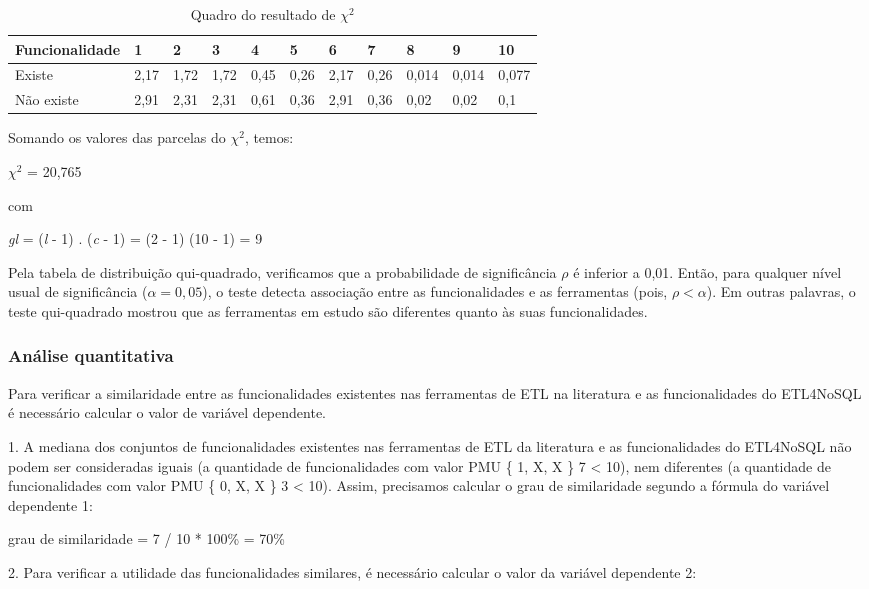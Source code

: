\begin{table}
	\centering
	\caption{Quadro do resultado de $ \chi^2 $}
	\label{chiquadrado}
	\begin{tabular}{|l|l|l|l|l|l|l|l|l|l|l|}
		\hline
		Funcionalidade & 1 & 2 & 3 & 4 & 5 & 6 & 7 & 8 & 9 & 10 \\ \hline
		Existe & 2,17 & 1,72 & 1,72 & 0,45 & 0,26 & 2,17 & 0,26 & 0,014 & 0,014 & 0,077  \\ \hline
		Não existe & 2,91 & 2,31 & 2,31 & 0,61 & 0,36 & 2,91 & 0,36 & 0,02 & 0,02 & 0,1 \\ \hline
	\end{tabular}
\end{table}

Somando os valores das parcelas do  $ \chi^2 $, temos: 

$ \chi^2 $ = 20,765

com

\textit{gl} = (\textit{l} - 1) . (\textit{c} - 1) = (2 - 1) (10 - 1) = 9

Pela tabela de distribuição qui-quadrado, verificamos que a probabilidade de significância $\rho$ é inferior a 0,01. Então, para qualquer nível usual de significância ($\alpha = 0,05$), o teste detecta associação entre as funcionalidades e as ferramentas (pois, $\rho < \alpha $). Em outras palavras, o teste qui-quadrado mostrou que as ferramentas em estudo são diferentes quanto às suas funcionalidades.

\subsubsection{Análise quantitativa}

Para verificar a similaridade entre as funcionalidades existentes nas ferramentas de ETL na literatura e as funcionalidades do ETL4NoSQL é necessário calcular o valor de variável dependente.

1. A mediana dos conjuntos de funcionalidades existentes nas ferramentas de ETL da literatura e as funcionalidades do ETL4NoSQL não podem ser consideradas iguais (a quantidade de funcionalidades com valor PMU \{ 1, X, X \} 7 < 10), nem diferentes (a quantidade de funcionalidades com valor PMU \{ 0, X, X \}  3 < 10). Assim, precisamos calcular o grau de similaridade segundo a fórmula do variável dependente 1:

grau de similaridade = 7 / 10 * 100\% = 70\% 

2. Para verificar a utilidade das funcionalidades similares, é necessário calcular o valor da variável dependente 2:


